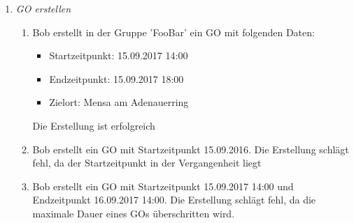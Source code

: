 \documentclass[parskip=full]{scrartcl}
\def\threedigits#1{%
  \ifnum#1<100 0\fi
  \ifnum#1<10 0\fi
  \number#1}
\begin{document}
\begin{enumerate}[label={\textbf{/T\protect\threedigits{\theenumi}0/}}, leftmargin=*, resume]
	\item \textit{GO erstellen} \label{Go erstellen - Test}
	\begin{enumerate}
		\item Bob erstellt in der Gruppe 'FooBar' ein GO mit folgenden Daten:
	\begin{itemize}
		\item Startzeitpunkt: 15.09.2017 14:00
		\item Endzeitpunkt: 15.09.2017 18:00
		\item Zielort: Mensa am Adenauerring
	\end{itemize}
	Die Erstellung ist erfolgreich
	
	\item Bob erstellt ein GO mit Startzeitpunkt 15.09.2016. Die Erstellung schlägt fehl, da der Startzeitpunkt in der Vergangenheit liegt
	\item Bob erstellt ein GO mit Startzeitpunkt 15.09.2017 14:00 und Endzeitpunkt 16.09.2017 14:00. Die Erstellung schlägt fehl, da die maximale Dauer eines GOs überschritten wird.
	\end{enumerate}
	

\end{enumerate}
\end{document}
